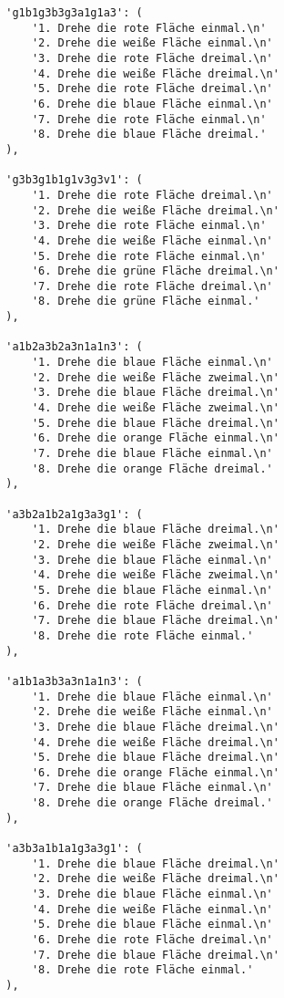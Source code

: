 \begin{lstlisting}
        'g1b1g3b3g3a1g1a3': (
            '1. Drehe die rote Fläche einmal.\n'
            '2. Drehe die weiße Fläche einmal.\n'
            '3. Drehe die rote Fläche dreimal.\n'
            '4. Drehe die weiße Fläche dreimal.\n'
            '5. Drehe die rote Fläche dreimal.\n'
            '6. Drehe die blaue Fläche einmal.\n'
            '7. Drehe die rote Fläche einmal.\n'
            '8. Drehe die blaue Fläche dreimal.'
        ),

        'g3b3g1b1g1v3g3v1': (
            '1. Drehe die rote Fläche dreimal.\n'
            '2. Drehe die weiße Fläche dreimal.\n'
            '3. Drehe die rote Fläche einmal.\n'
            '4. Drehe die weiße Fläche einmal.\n'
            '5. Drehe die rote Fläche einmal.\n'
            '6. Drehe die grüne Fläche dreimal.\n'
            '7. Drehe die rote Fläche dreimal.\n'
            '8. Drehe die grüne Fläche einmal.'
        ),

        'a1b2a3b2a3n1a1n3': (
            '1. Drehe die blaue Fläche einmal.\n'
            '2. Drehe die weiße Fläche zweimal.\n'
            '3. Drehe die blaue Fläche dreimal.\n'
            '4. Drehe die weiße Fläche zweimal.\n'
            '5. Drehe die blaue Fläche dreimal.\n'
            '6. Drehe die orange Fläche einmal.\n'
            '7. Drehe die blaue Fläche einmal.\n'
            '8. Drehe die orange Fläche dreimal.'
        ),

        'a3b2a1b2a1g3a3g1': (
            '1. Drehe die blaue Fläche dreimal.\n'
            '2. Drehe die weiße Fläche zweimal.\n'
            '3. Drehe die blaue Fläche einmal.\n'
            '4. Drehe die weiße Fläche zweimal.\n'
            '5. Drehe die blaue Fläche einmal.\n'
            '6. Drehe die rote Fläche dreimal.\n'
            '7. Drehe die blaue Fläche dreimal.\n'
            '8. Drehe die rote Fläche einmal.'
        ),

        'a1b1a3b3a3n1a1n3': (
            '1. Drehe die blaue Fläche einmal.\n'
            '2. Drehe die weiße Fläche einmal.\n'
            '3. Drehe die blaue Fläche dreimal.\n'
            '4. Drehe die weiße Fläche dreimal.\n'
            '5. Drehe die blaue Fläche dreimal.\n'
            '6. Drehe die orange Fläche einmal.\n'
            '7. Drehe die blaue Fläche einmal.\n'
            '8. Drehe die orange Fläche dreimal.'
        ),

        'a3b3a1b1a1g3a3g1': (
            '1. Drehe die blaue Fläche dreimal.\n'
            '2. Drehe die weiße Fläche dreimal.\n'
            '3. Drehe die blaue Fläche einmal.\n'
            '4. Drehe die weiße Fläche einmal.\n'
            '5. Drehe die blaue Fläche einmal.\n'
            '6. Drehe die rote Fläche dreimal.\n'
            '7. Drehe die blaue Fläche dreimal.\n'
            '8. Drehe die rote Fläche einmal.'
        ),


\end{lstlisting}
